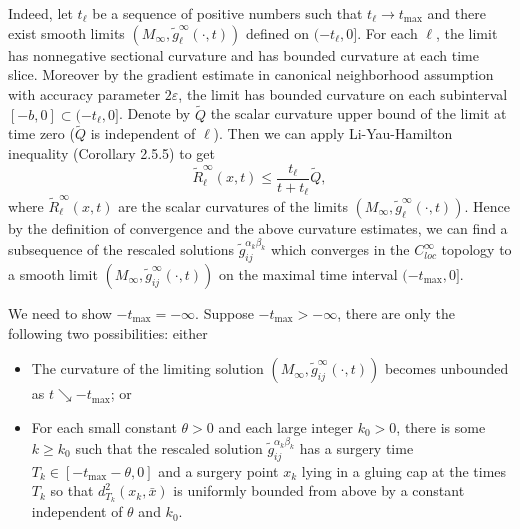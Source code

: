 Indeed, let $t_{\ell}$ be a sequence of positive numbers such that
$t_{\ell}\rightarrow t_{\max}$ and there exist smooth limits
$(M_{\infty},\widetilde{g}^{\infty}_{{\ell}}(\cdot,t))$ defined on
$(-t_{\ell},0]$. For each ${\ell}$, the limit has nonnegative
sectional curvature and has bounded curvature at each time slice.
Moreover by the gradient estimate in canonical neighborhood
assumption with accuracy parameter $2\varepsilon$, the limit has
bounded curvature on each subinterval
$[-b,0]\subset(-t_{\ell},0]$. Denote by $\widetilde{Q}$ the scalar
curvature upper bound of the limit at time zero ($\widetilde{Q}$
is independent of ${\ell}$). Then we can apply Li-Yau-Hamilton
inequality (Corollary 2.5.5) to get
$$
 \widetilde{R}^{\infty}_{{\ell}}(x,t)\leq
 \frac{t_{\ell}}{t+t_{\ell}}\widetilde{Q},
$$
where $\widetilde{R}^{\infty}_{{\ell}}(x,t)$ are the scalar
curvatures of the limits
$(M_{\infty},\widetilde{g}^{\infty}_{{\ell}}(\cdot,t))$. Hence by
the definition of convergence and the above curvature estimates,
we can find a subsequence of the rescaled solutions
$\widetilde{g}^{\alpha_k\beta_k}_{ij}$ which converges in the
$C^{\infty}_{loc}$ topology to a smooth limit
$(M_{\infty},\widetilde{g}^{\infty}_{ij}(\cdot,t))$ on the maximal
time interval $(-t_{\max},0]$.

We need to show $-t_{\max}=-\infty$. Suppose $-t_{\max}>-\infty$,
there are only the following two possibilities: either
\begin{itemize}
\item[(1)] The curvature of the limiting solution
$(M_{\infty},\widetilde{g}^{\infty}_{ij}(\cdot,t))$ becomes
unbounded as $t\searrow -t_{\max}$; or \item[(2)] For each small
constant $\theta>0$ and each large integer $k_0>0$, there is some
$k\geq k_0$ such that the rescaled solution
$\widetilde{g}^{\alpha_k\beta_k}_{ij}$ has a surgery time
$T_k\in[-t_{\max}-\theta,0]$ and a surgery point $x_k$ lying in a
gluing cap at the times $T_k$ so that $d^2_{T_k}(x_k,\bar{x})$ is
uniformly bounded from above by a constant independent of $\theta$
and $k_0$.
\end{itemize}

